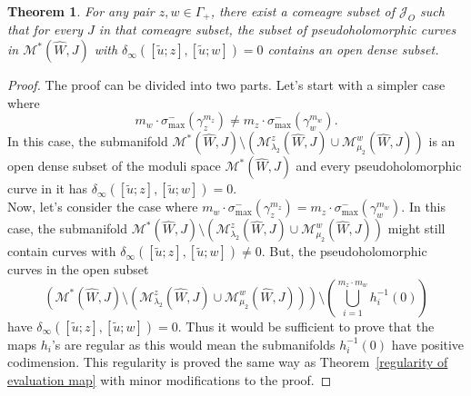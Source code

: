 \documentclass[10pt,a4paper]{amsart}
\newtheorem{theorem}{Theorem}
\newcommand{\cJ}{\mathcal{J}}
\newcommand{\cM}{\mathcal{M}}
\begin{document}
\begin{theorem} \label{delta_rel=0}
For any pair $z,w\in \Gamma_+$, there exist a comeagre subset of $\cJ_O$ such that for every $J$ in that comeagre subset, the subset of pseudoholomorphic curves in $\cM^*(\widehat{W},J)$ with $\delta_{\infty}([\tilde{u}; z], [\tilde{u};w])=0$ contains an open dense subset.

\end{theorem}

\begin{proof}
The proof can be divided into two parts. Let's start with a simpler case where 
$$m_w\cdot \sigma^-_{\max}(\gamma_z^{m_z}) \neq m_z \cdot \sigma^-_{\max}(\gamma_w^{m_w}).$$
In this case, the submanifold $\cM^*(\widehat{W},J)\setminus \left(\cM^z_{\lambda_2}(\widehat{W},J) \cup \cM^w_{\mu_2}(\widehat{W},J)\right)$ is an open dense subset of the moduli space $\cM^*(\widehat{W},J)$ and every pseudoholomorphic curve in it has $\delta_{\infty}([\tilde{u}; z], [\tilde{u};w])=0$.\\

Now, let's consider the case where $m_w\cdot \sigma^-_{\max}(\gamma_z^{m_z}) = m_z \cdot \sigma^-_{\max}(\gamma_w^{m_w})$. In this case, the submanifold $\cM^*(\widehat{W},J)\setminus \left(\cM^z_{\lambda_2}(\widehat{W},J) \cup \cM^w_{\mu_2}(\widehat{W},J)\right)$ might still contain curves with $\delta_{\infty}([\tilde{u}; z], [\tilde{u};w])\neq0$. But, the pseudoholomorphic curves in the open subset 
$$\left( \cM^*(\widehat{W},J)\setminus \left(\cM^z_{\lambda_2}(\widehat{W},J) \cup \cM^w_{\mu_2}(\widehat{W},J)\right) \right) \setminus (\bigcup\limits_{i=1}^{m_z\cdot m_w}h_i^{-1}(0))$$
have $\delta_{\infty}([\tilde{u}; z], [\tilde{u};w])=0$. Thus it would be sufficient to prove that the maps $h_{i}$'s are regular as this would mean the submanifolds $h_{i}^{-1}(0)$ have positive codimension. This regularity is proved the same way as Theorem~\ref{regularity of evaluation map} with minor modifications to the proof.
\end{proof}
\end{document}
